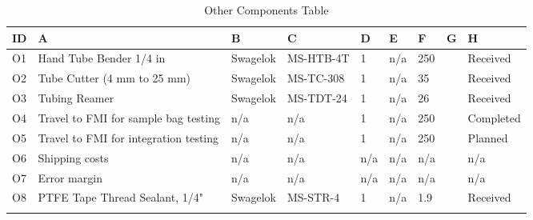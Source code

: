 \begin{longtable} {|m{}|m{}|m{}|m{}|m{}|m{}|m{}|m{}|m{}|} \hline \textbf{ID} & \textbf{A} & \textbf{B} & \textbf{C} & \textbf{D} & \textbf{E} & \textbf{F}  & \textbf{G}  & \textbf{H} \\ \hline O1 & Hand Tube Bender 1/4 in & Swagelok & MS-HTB-4T & 1 & n/a & 250 &  & Received \\ \hline O2 & Tube Cutter (4 mm to 25 mm) & Swagelok & MS-TC-308 & 1 & n/a & 35 &  & Received \\ \hline O3 & Tubing Reamer & Swagelok & MS-TDT-24 & 1 & n/a & 26 &  & Received \\ \hline O4 & Travel to FMI for sample bag testing & n/a & n/a & 1 & n/a & 250 &  & Completed \\ \hline O5 & Travel to FMI for integration testing & n/a & n/a & 1 & n/a & 250 &  & Planned \\ \hline O6 & Shipping costs & n/a & n/a & n/a & n/a & n/a &  & n/a \\ \hline O7 & Error margin & n/a & n/a & n/a & n/a & n/a &  & n/a \\ \hline O8 & PTFE Tape Thread Sealant, 1/4" & Swagelok & MS-STR-4 & 1 & n/a & 1.9 &  & Received \\ \hline \caption{Other Components Table} \label{tab:component-table-other} \end{longtable} \raggedbottom